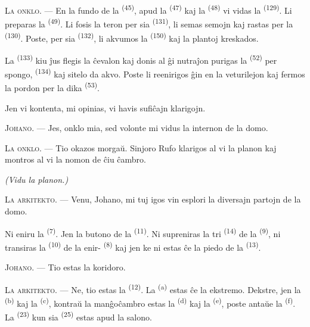 \textsc{La onklo}. --- En la fundo de la  \textsuperscript{(45)},
apud la  \textsuperscript{(47)} kaj la 
\textsuperscript{(48)} vi vidas la 
\textsuperscript{(129)}. Li preparas la 
\textsuperscript{(49)}. Li fosis la teron per sia 
\textsuperscript{(131)}, li semas semojn kaj rastas per la 
\textsuperscript{(130)}. Poste, per sia  \textsuperscript{(132)},
li akvumos la  \textsuperscript{(150)} kaj la plantoj kreskados.

La  \textsuperscript{(133)} kiu ĵus flegis la ĉevalon kaj
donis al ĝi nutraĵon purigas la  \textsuperscript{(52)} per
spongo,  \textsuperscript{(134)} kaj sitelo da akvo. Poste
li reenirigos ĝin en la veturilejon kaj fermos la pordon per la dika
 \textsuperscript{(53)}.

Jen vi kontenta, mi opinias, vi havis sufiĉajn klarigojn.

\textsc{Johano}. --- Jes, onklo mia, sed volonte mi vidus la internon de la
domo.

\textsc{La onklo}. --- Tio okazos morgaŭ. Sinjoro Rufo klarigos al vi la planon
kaj montros al vi la nomon de ĉiu ĉambro.

\VUsaut{3.0mm}
\VUsaut{2.4mm}

{\centering\textit{(Vidu la planon.)}\par}
\VUsaut{2.4mm}

\textsc{La arkitekto}. --- Venu, Johano, mi tuj igos vin esplori la diversajn
partojn de la domo.

Ni eniru la  \textsuperscript{(7)}. Jen la butono de la
 \textsuperscript{(11)}. Ni supreniras la tri
 \textsuperscript{(14)} de la 
\textsuperscript{(9)}, ni transiras la  \textsuperscript{(10)}
de la enir- \textsuperscript{(8)} kaj jen ke ni estas ĉe la piedo
de la  \textsuperscript{(13)}.

\textsc{Johano}. --- Tio estas la koridoro.

\textsc{La arkitekto}. --- Ne, tio estas la 
\textsuperscript{(12)}. La  \textsuperscript{(a)} estas ĉe la
ekstremo. Dekstre, jen la  \textsuperscript{(b)} kaj la
 \textsuperscript{(c)}, kontraŭ la manĝoĉambro estas la
 \textsuperscript{(d)} kaj la 
\textsuperscript{(e)}, poste antaŭe la 
\textsuperscript{(f)}. La  \textsuperscript{(23)} kun sia
 \textsuperscript{(25)} estas apud la salono.

